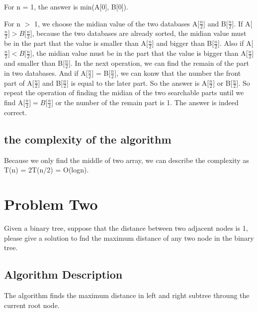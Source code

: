 \documentclass{article}
\begin{document}
\begin{CJK*}{UTF8}{gbsn}
For n = 1, the answer is min(A[0], B[0]).

For n $>$ 1, we choose the midian value of the two databases A[$\frac{n}{2}$] and B[$\frac{n}{2}$]. If A[$\frac{n}{2}] > B[\frac{n}{2}$], because the two databases are already sorted, the midian value must be in the part that the value is smaller than A[$\frac{n}{2}$] and bigger than B[$\frac{n}{2}$]. Also if A[$\frac{n}{2}] < B[\frac{n}{2}$], the midian value must be in the part that the value is bigger than A[$\frac{n}{2}$] and smaller than B[$\frac{n}{2}$]. In the next operation, we can find the remain of the part in two databases. And if A[$\frac{n}{2}$] = B[$\frac{n}{2}$], we can konw that the number the front part of A[$\frac{n}{2}$] and B[$\frac{n}{2}$] is equal to the later part. So the answer is A[$\frac{n}{2}$] or B[$\frac{n}{2}$]. So repeat the operation of finding the midian of the two searchable parts until we find A[$\frac{n}{2}] = B[\frac{n}{2}$] or the number of the remain part is 1. The answer is indeed correct.





\subsection{the complexity of the algorithm}

Because we only find the middle of two array, we can describe the complexity as T(n) = 2T(n/2) = O(logn).

\newpage
\section{Problem Two}

Given a binary tree, suppose that the distance between two adjacent nodes is 1, please give a solution to fnd the maximum distance of any two node in the binary tree.

\subsection{Algorithm Description}

The algorithm finds the maximum distance in left and right subtree throung the current root node.


\end{CJK*}
\end{document}
